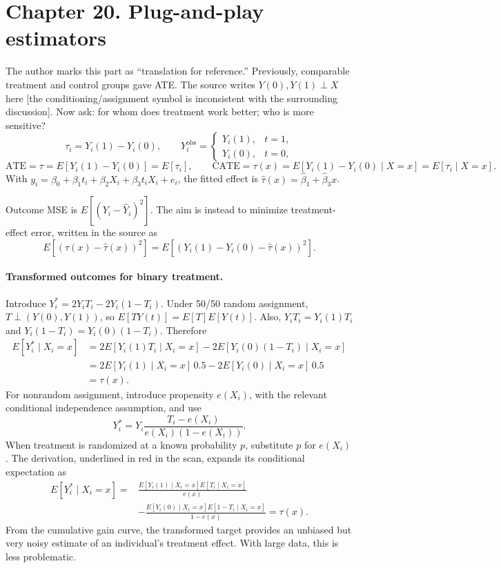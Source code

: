 {\section{Chapter 20. Plug-and-play estimators}
The author marks this part as ``translation for reference.'' Previously, comparable treatment and control groups gave ATE. The source writes $Y(0),Y(1)\perp X$ here [the conditioning/assignment symbol is inconsistent with the surrounding discussion]. Now ask: for whom does treatment work better; who is more sensitive?
\[\tau_i=Y_i(1)-Y_i(0),\qquad
Y_i^{\mathrm{obs}}=\begin{cases}Y_i(1),&t=1,\\Y_i(0),&t=0,\end{cases}
\]
\[\mathrm{ATE}=\tau=E[Y_i(1)-Y_i(0)]=E[\tau_i],\qquad
\mathrm{CATE}=\tau(x)=E[Y_i(1)-Y_i(0)\mid X=x]=E[\tau_i\mid X=x].\]
With $y_i=\beta_0+\beta_1t_i+\beta_2X_i+\beta_3t_iX_i+e_i$, the fitted effect is $\hat\tau(x)=\hat\beta_1+\hat\beta_3x$. 

Outcome MSE is $E[(Y_i-\hat Y_i)^2]$. The aim is instead to minimize treatment-effect error, written in the source as
\[E[(\tau(x)-\hat\tau(x))^2]=E[(Y_i(1)-Y_i(0)-\hat\tau(x))^2].\]


\paragraph{Transformed outcomes for binary treatment.}
Introduce $Y_i^*=2Y_iT_i-2Y_i(1-T_i)$. Under 50/50 random assignment, $T\perp(Y(0),Y(1))$, so $E[TY(t)]=E[T]E[Y(t)]$. Also, $Y_iT_i=Y_i(1)T_i$ and $Y_i(1-T_i)=Y_i(0)(1-T_i)$. Therefore
\begin{align*}
E[Y_i^*\mid X_i=x]
&=2E[Y_i(1)T_i\mid X_i=x]-2E[Y_i(0)(1-T_i)\mid X_i=x]\\
&=2E[Y_i(1)\mid X_i=x]\,0.5-2E[Y_i(0)\mid X_i=x]\,0.5\\
&=\tau(x).
\end{align*}
For nonrandom assignment, introduce propensity $e(X_i)$, with the relevant conditional independence assumption, and use
\[Y_i^*=Y_i\frac{T_i-e(X_i)}{e(X_i)(1-e(X_i))}.\]
When treatment is randomized at a known probability $p$, substitute $p$ for $e(X_i)$. The derivation, underlined in red in the scan, expands its conditional expectation as
\begin{align*}
E[Y_i^*\mid X_i=x]
={}&\frac{E[Y_i(1)\mid X_i=x]E[T_i\mid X_i=x]}{e(x)}\\
&-\frac{E[Y_i(0)\mid X_i=x]E[1-T_i\mid X_i=x]}{1-e(x)}=\tau(x).
\end{align*}
From the cumulative gain curve, the transformed target provides an unbiased but very noisy estimate of an individual's treatment effect. With large data, this is less problematic.

}
